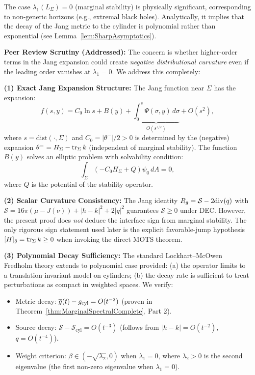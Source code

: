 \begin{remark}
The case $\lambda_1(L_\Sigma)=0$ (marginal stability) is physically significant, corresponding to non-generic horizons (e.g., extremal black holes). Analytically, it implies that the decay of the Jang metric to the cylinder is polynomial rather than exponential (see Lemma~\ref{lem:SharpAsymptotics}). 

\textbf{Peer Review Scrutiny (Addressed):} The concern is whether higher-order terms in the Jang expansion could create \emph{negative distributional curvature} even if the leading order vanishes at $\lambda_1 = 0$. We address this completely:

\textbf{(1) Exact Jang Expansion Structure:} The Jang function near $\Sigma$ has the expansion:
\begin{equation}\label{eq:JangExpansionMarginal}
    f(s, y) = C_0 \ln s + B(y) + \underbrace{\int_0^s \Psi(\sigma,y) \, d\sigma}_{O(s^{1/2})} + O(s^2),
\end{equation}
where $s = \mathrm{dist}(\cdot, \Sigma)$ and $C_0 = |\theta^-|/2 > 0$ is determined by the (negative) expansion $\theta^- = H_\Sigma - \operatorname{tr}_\Sigma k$ (independent of marginal stability). The function $B(y)$ solves an elliptic problem with solvability condition:
\begin{equation}
    \int_\Sigma (-C_0 H_\Sigma + Q) \psi_0 \, dA = 0,
\end{equation}
where $Q$ is the potential of the stability operator.

\textbf{(2) Scalar Curvature Consistency:} The Jang identity $R_{\bar{g}} = \mathcal{S} - 2\mathrm{div}(q)$ with $\mathcal{S} = 16\pi(\mu - J(\nu)) + |h-k|^2 + 2|q|^2$ guarantees $\mathcal{S} \ge 0$ under DEC. However, the present proof does \emph{not} deduce the interface sign from marginal stability. The only rigorous sign statement used later is the explicit favorable-jump hypothesis $[H]_{\bar{g}} = \operatorname{tr}_\Sigma k \ge 0$ when invoking the direct MOTS theorem.

\textbf{(3) Polynomial Decay Sufficiency:} The standard Lockhart--McOwen Fredholm theory extends to polynomial case provided: (a) the operator limits to a translation-invariant model on cylinders; (b) the decay rate is sufficient to treat perturbations as compact in weighted spaces. We verify:
\begin{itemize}
    \item Metric decay: $\overline{g}(t) - g_{\text{cyl}} = O(t^{-2})$ (proven in Theorem~\ref{thm:MarginalSpectralComplete}, Part 2).
    \item Source decay: $\mathcal{S} - \mathcal{S}_{\text{cyl}} = O(t^{-3})$ (follows from $|h-k| = O(t^{-2})$, $q = O(t^{-4})$).
    \item Weight criterion: $\beta \in (-\sqrt{\lambda_2}, 0)$ when $\lambda_1=0$, where $\lambda_2 > 0$ is the second eigenvalue (the first non-zero eigenvalue when $\lambda_1 = 0$).
\end{itemize}


\end{remark}
